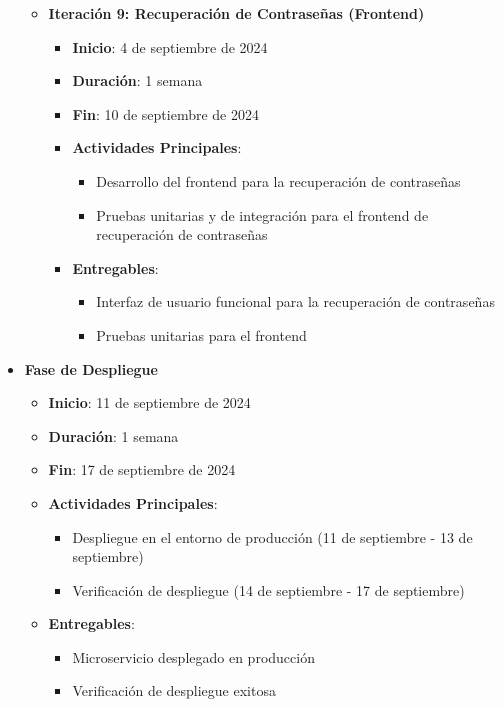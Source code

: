 \begin{itemize}
\begin{itemize}
              \item \textbf{Iteración 9: Recuperación de Contraseñas (Frontend)}
                    \begin{itemize}
                        \item \textbf{Inicio}: 4 de septiembre de 2024
                        \item \textbf{Duración}: 1 semana
                        \item \textbf{Fin}: 10 de septiembre de 2024
                        \item \textbf{Actividades Principales}:
                              \begin{itemize}
                                  \item Desarrollo del frontend para la recuperación de contraseñas
                                  \item Pruebas unitarias y de integración para el frontend de recuperación de contraseñas
                              \end{itemize}
                        \item \textbf{Entregables}:
                              \begin{itemize}
                                  \item Interfaz de usuario funcional para la recuperación de contraseñas
                                  \item Pruebas unitarias para el frontend
                              \end{itemize}
                    \end{itemize}
          \end{itemize}

    \item \textbf{Fase de Despliegue}
          \begin{itemize}
              \item \textbf{Inicio}: 11 de septiembre de 2024
              \item \textbf{Duración}: 1 semana
              \item \textbf{Fin}: 17 de septiembre de 2024
              \item \textbf{Actividades Principales}:
                    \begin{itemize}
                        \item Despliegue en el entorno de producción (11 de septiembre - 13 de septiembre)
                        \item Verificación de despliegue (14 de septiembre - 17 de septiembre)
                    \end{itemize}
              \item \textbf{Entregables}:
                    \begin{itemize}
                        \item Microservicio desplegado en producción
                        \item Verificación de despliegue exitosa
                    \end{itemize}
          \end{itemize}
\end{itemize}

